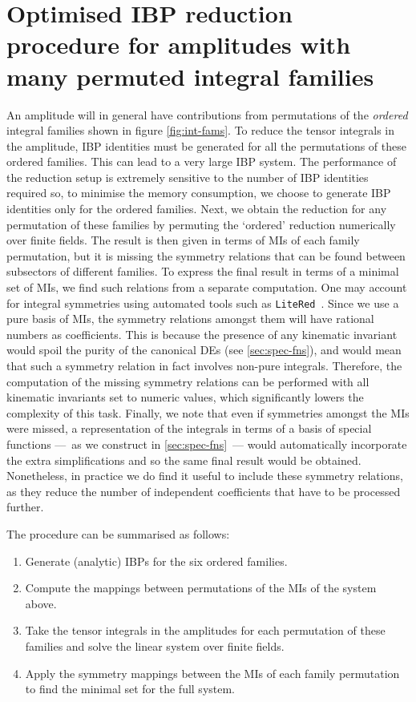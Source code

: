 \section{Optimised \acs{IBP} reduction procedure for amplitudes with many permuted integral families}
\label{app:altIBPs}
An amplitude will in general have contributions from permutations of
the \textit{ordered} integral families shown in figure \ref{fig:int-fams}. To reduce the tensor integrals in the amplitude, \ac{IBP} identities must
be generated for all the permutations of these ordered families. This can
lead to a very large \ac{IBP} system. 
The performance of the reduction setup is extremely sensitive to the number of \ac{IBP}
identities required so, to minimise the memory consumption, we choose to
generate \ac{IBP} identities only for the ordered families. Next, we obtain the reduction for any permutation of these families by permuting the `ordered' reduction numerically over finite fields.
The result is then given in terms of \acp{MI} of each family permutation, but it is missing the symmetry relations that can be found between subsectors of different families. To express the final result in terms of a minimal set of \acp{MI}, we find such relations
from a separate computation. One may account for integral symmetries using automated tools such as \texttt{LiteRed}~\cite{Lee:2012cn}. Since we use a pure basis of \acp{MI}, the symmetry relations
amongst them will have rational numbers as coefficients. This is because the presence of any kinematic invariant would spoil the purity of the canonical \acp{DE} (see \cref{sec:spec-fns}), and would mean that such a symmetry relation in fact involves non-pure integrals. Therefore, the computation of the missing symmetry relations can be performed with all kinematic invariants set to numeric values, which significantly lowers the complexity of this task. Finally, we note that even if symmetries amongst the
\acp{MI} were missed, a representation of the integrals in terms of a basis of
special functions ---~as we construct in \cref{sec:spec-fns}~--- would automatically incorporate the extra simplifications and
so the same final result would be obtained. Nonetheless, in practice we do find it useful to include these symmetry relations, as they reduce the number of independent coefficients that have to be processed further.

The procedure can be summarised as follows:
\begin{enumerate}
	\item Generate (analytic) IBPs for the six ordered families.
	\item Compute the mappings between permutations of the \acp{MI} of the system above.
	\item Take the tensor integrals in the amplitudes for each permutation of these families and solve the linear system over finite fields.
	\item Apply the symmetry mappings between the \acp{MI} of each family permutation to find the minimal set for the full system.
\end{enumerate}

